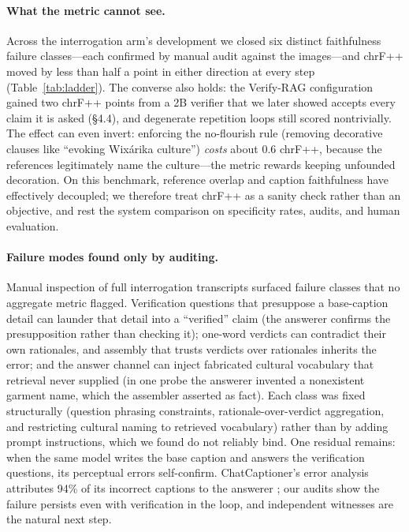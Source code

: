 \documentclass[11pt]{article}
\begin{document}
\paragraph{What the metric cannot see.}
Across the interrogation arm's development we closed six distinct
faithfulness failure classes---each confirmed by manual audit against the
images---and chrF++ moved by less than half a point in either direction at
every step (Table~\ref{tab:ladder}). The converse also holds: the Verify-RAG
configuration gained two chrF++ points from a 2B verifier that we later
showed accepts every claim it is asked (\S4.4), and degenerate repetition
loops still scored nontrivially. The effect can even invert: enforcing the
no-flourish rule (removing decorative clauses like ``evoking Wixárika
culture'') \emph{costs} about 0.6 chrF++, because the references
legitimately name the culture---the metric rewards keeping unfounded
decoration. On this benchmark, reference overlap and
caption faithfulness have effectively decoupled; we therefore treat chrF++
as a sanity check rather than an objective, and rest the system comparison
on specificity rates, audits, and human evaluation.

\paragraph{Failure modes found only by auditing.}
Manual inspection of full interrogation transcripts surfaced failure classes
that no aggregate metric flagged. Verification questions that presuppose a
base-caption detail can launder that detail into a ``verified'' claim
(the answerer confirms the presupposition rather than checking it);
one-word verdicts can contradict their own rationales, and assembly that
trusts verdicts over rationales inherits the error; and the answer channel
can inject fabricated cultural vocabulary that retrieval never supplied (in
one probe the answerer invented a nonexistent garment name, which the
assembler asserted as fact). Each class was fixed
structurally (question phrasing constraints, rationale-over-verdict
aggregation, and restricting cultural naming to retrieved vocabulary)
rather than by adding prompt instructions, which we found do not reliably
bind. One residual remains: when the same model writes the base caption and
answers the verification questions, its perceptual errors self-confirm.
ChatCaptioner's error analysis attributes 94\% of its incorrect captions to
the answerer \citep{zhu2023chatcaptioner}; our audits show the failure
persists even with verification in the loop, and independent witnesses are
the natural next step.
\end{document}
